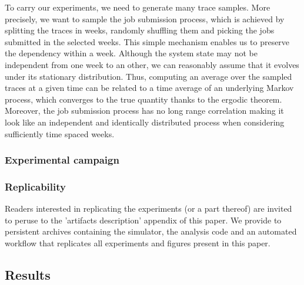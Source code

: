 \documentclass[sigconf]{acmart}
\begin{document}

To carry our experiments, we need to generate many trace samples. More
precisely, we want to sample the job submission process, which is achieved by
splitting the traces in weeks, randomly shuffling them and picking the jobs
submitted in the selected weeks.  This simple mechanism enables us to preserve
the dependency within a week. Although the system state may not be independent
from one week to an other, we can reasonably assume that it evolves under its
stationary distribution. Thus, computing an average over the sampled traces at
a given time can be related to a time average of an underlying Markov process,
which converges to the true quantity thanks to the ergodic theorem.  Moreover,
the job submission process has no long range correlation making it look like an
independent and identically distributed process when considering sufficiently
time spaced weeks.

\subsubsection{Experimental campaign}


\subsubsection{Replicability}

Readers interested in replicating the experiments (or a part thereof) are
invited to peruse to the 'artifacts description' appendix of this paper.  We
provide to persistent archives containing the simulator, the analysis code and
an automated workflow that replicates all experiments and figures present in
this paper.

\subsection{Results}
\label{sub:results}
\end{document}
